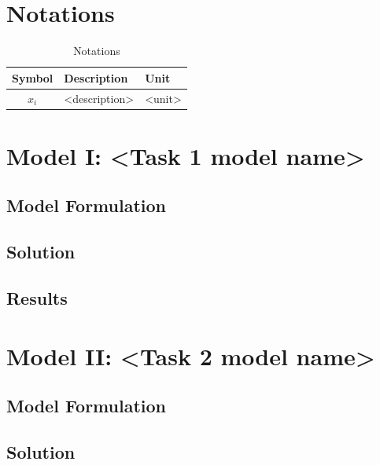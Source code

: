 \documentclass{mcmthesis}
\begin{document}
\section{Notations}
\begin{table}[H]
  \centering
  \caption{Notations}
  \begin{tabular}{cll}
    \toprule
    Symbol & Description & Unit \\
    \midrule
    $x_i$ & <description> & <unit> \\
    \bottomrule
  \end{tabular}
\end{table}


\section{Model I: <Task 1 model name>}
\subsection{Model Formulation}
\subsection{Solution}
\subsection{Results}

\section{Model II: <Task 2 model name>}
\subsection{Model Formulation}
\subsection{Solution}
\end{document}
